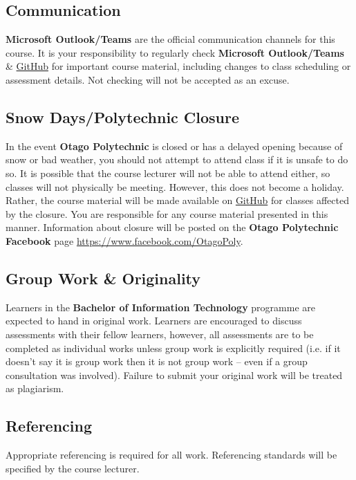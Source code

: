 \documentclass{article}
\begin{document}
\subsection*{Communication}
\textbf{Microsoft Outlook/Teams} are the official communication channels for this course. It is your responsibility to regularly check \textbf{Microsoft Outlook/Teams} \& \href{https://github.com/otago-polytechnic-bit-courses/IN721-mobile-application-development}{GitHub} for important course material, including changes to class scheduling or assessment details. Not checking will not be accepted as an excuse.

\subsection*{Snow Days/Polytechnic Closure}
In the event \textbf{Otago Polytechnic} is closed or has a delayed opening because of snow or bad weather, you should not attempt to attend class if it is unsafe to do so. It is possible that the course lecturer will not be able to attend either, so classes will not physically be meeting. However, this does not become a holiday. Rather, the course material will be made available on \href{https://github.com/otago-polytechnic-bit-courses/IN721-mobile-application-development}{GitHub} for classes affected by the closure. You are responsible for any course material presented in this manner. Information about closure will be posted on the \textbf{Otago Polytechnic Facebook} page \href{https://www.facebook.com/OtagoPoly}{https://www.facebook.com/OtagoPoly}.

\subsection*{Group Work \& Originality}
Learners in the \textbf{Bachelor of Information Technology} programme are expected to hand in original work. Learners are encouraged to discuss assessments with their fellow learners, however, all assessments are to be completed as individual works unless group work is explicitly required (i.e. if it doesn’t say it is group work then it is not group work – even if a group consultation was involved). Failure to submit your original work will be treated as plagiarism.

\subsection*{Referencing}
Appropriate referencing is required for all work. Referencing standards will be specified by the course lecturer.
\end{document}
